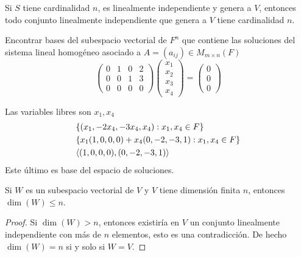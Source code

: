 \documentclass[12pt,a4paper]{book}
\begin{document}
    \begin{proposicion}
    \label{prop:17}
        Si $S$ tiene cardinalidad $n$, es linealmente independiente y genera a $V$, entonces todo
        conjunto linealmente independiente que genera a $V$ tiene cardinalidad $n$.
    \end{proposicion}

    Encontrar bases del subespacio vectorial de $F^{n}$ que contiene las soluciones del sistema
    lineal homogéneo asociado a $A=(a_{ij})\in M_{m\times n}(F)$
    \begin{equation*}
        \begin{pmatrix}
            0 & 1 & 0 & 2\\
            0 & 0 & 1 & 3\\
            0 & 0 & 0 & 0
        \end{pmatrix}
        \begin{pmatrix}
            x_{1}\\
            x_{2}\\
            x_{3}\\
            x_{4}
        \end{pmatrix}
        =
        \begin{pmatrix}
            0\\
            0\\
            0
        \end{pmatrix}
    \end{equation*}

    Las variables libres son $x_{1},x_{4}$
    \begin{align*}
        &\{(x_{1},-2x_{4},-3x_{4},x_{4}):x_{1},x_{4}\in F\}\\
        &\{x_{1}(1,0,0,0)+x_{4}(0,-2,-3,1):x_{1},x_{4}\in F\}\\
        &\langle (1,0,0,0),(0,-2,-3,1) \rangle
    \end{align*}
    Este último es base del espacio de soluciones.

    \begin{proposicion}
    \label{prop:18}
        Si $W$ es un subespacio vectorial de $V$ y $V$ tiene dimensión finita $n$, entonces
        $\dim(W)\leq n$.
    \end{proposicion}

    \begin{proof}
        Si $\dim(W)\gt n$, entonces existiría en $V$ un conjunto linealmente independiente con más
        de $n$ elementos, esto es una contradicción. De hecho $\dim(W)=n$ si y solo si $W=V$.
    \end{proof}
\end{document}
